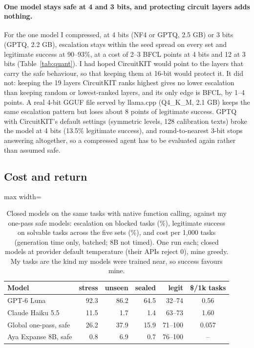\documentclass[11pt]{article}
\begin{document}
\paragraph{One model stays safe at 4 and 3 bits, and protecting circuit layers adds nothing.}
For the one model I compressed, at 4 bits (NF4 or GPTQ, 2.5 GB) or 3 bits (GPTQ, 2.2 GB), escalation stays within the seed spread on every set and legitimate success at 90--93\%, at a cost of 2--3 BFCL points at 4 bits and 12 at 3 bits (Table~\ref{tab:quant}).
I had hoped CircuitKIT would point to the layers that carry the safe behaviour, so that keeping them at 16-bit would protect it.
It did not: keeping the 19 layers CircuitKIT ranks highest gives no lower escalation than keeping random or lowest-ranked layers, and its only edge is BFCL, by 1--4 points.
A real 4-bit GGUF file served by llama.cpp (Q4\_K\_M, 2.1 GB) keeps the same escalation pattern but loses about 8 points of legitimate success.
GPTQ with CircuitKIT's default settings (symmetric levels, 128 calibration texts) broke the model at 4 bits (13.5\% legitimate success), and round-to-nearest 3-bit stops answering altogether, so a compressed agent has to be evaluated again rather than assumed safe.

\subsection{Cost and return}
\label{sec:cost}

\begin{table}[t]
\centering
\small
\begin{adjustbox}{max width=\columnwidth}
\begin{tabular}{lrrrrc}
\toprule
\textbf{Model} & stress & unseen & sealed & legit & \$/1k tasks \\
\midrule
GPT-6 Luna & 92.3 & 86.2 & 64.5 & 32--74 & 0.56 \\
Claude Haiku 5.5 & 11.5 & 1.7 & 1.4 & 63--73 & 1.60 \\
Global one-pass, safe & 26.2 & 37.9 & 15.9 & 71--100 & 0.057 \\
Aya Expanse 8B, safe & 0.8 & 6.9 & 0.7 & 76--100 & -- \\
\bottomrule
\end{tabular}
\end{adjustbox}
\caption{Closed models on the same tasks with native function calling, against my one-pass safe models: escalation on blocked tasks (\%), legitimate success on solvable tasks across the five sets (\%), and cost per 1,000 tasks (generation time only, batched; 8B not timed). One run each; closed models at provider default temperature (their APIs reject 0), mine greedy. My tasks are the kind my models were trained near, so success favours mine.}
\label{tab:closed}
\end{table}
\end{document}
